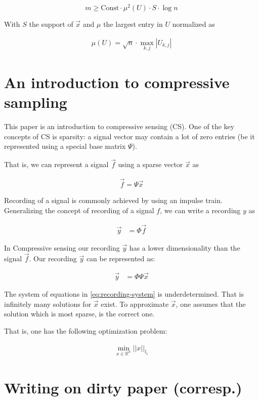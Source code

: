 \documentclass[report, oneside, a4paper, openany]{memoir}
\begin{document}
\begin{equation}
	m \geq \text{Const}\cdot \mu^2(U) \cdot S \cdot \log n
\end{equation}

With $S$ the support of $\vec{x}$ and $\mu$ the largest entry in $U$ normalized as

\begin{align*}
	\mu(U) = \sqrt{n} \cdot \max_{k,j} |U_{k,j}|
\end{align*}
\section{An introduction to compressive sampling \cite{candes2008introduction}}
This paper is an introduction to compressive sensing (CS). One of the key concepts of CS is sparsity: a signal vector may contain a lot of zero entries (be it represented using a special base matrix $\Psi$).

That is, we can represent a signal $\vec{f}$ using a sparse vector $\vec{x}$ as

\begin{align*}
  \vec{f} = \Psi \vec{x}
\end{align*}

Recording of a signal is commonly achieved by using an impulse train. Generalizing the concept of recording of a signal $f$, we can write a recording $y$ as

\begin{align*}
  \vec{y} &= \Phi \vec{f}
\end{align*}

In Compressive sensing our recording $\vec{y}$ has a lower dimensionality than
the signal $\vec{f}$. Our recording $\vec{y}$ can be represented as:

\begin{align} \label{eq:recording-system}
  \vec{y} &= \Phi \Psi \vec{x}
\end{align}

The system of equations in \ref{eq:recording-system} is underdetermined. That is
infinitely many solutions for $\vec{x}$ exist. To approximate $\vec{x}$, one assumes that the solution which is most sparse, is the correct one.

That is, one has the following optimization problem:

\begin{align*}
  \min_{x \in \mathbb{R}^n} ||x||_{l_1}
\end{align*}
\section{Writing on dirty paper (corresp.) \cite{costa1983writing}}
\end{document}
